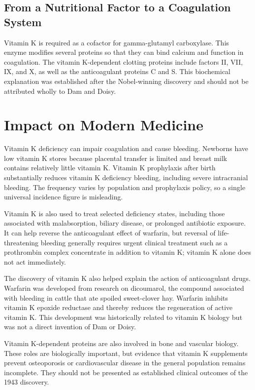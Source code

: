 \subsection{From a Nutritional Factor to a Coagulation System}

Vitamin K is required as a cofactor for gamma-glutamyl carboxylase. This enzyme modifies several proteins so that they can bind calcium and function in coagulation. The vitamin K-dependent clotting proteins include factors II, VII, IX, and X, as well as the anticoagulant proteins C and S. This biochemical explanation was established after the Nobel-winning discovery and should not be attributed wholly to Dam and Doisy.

\section{Impact on Modern Medicine}

Vitamin K deficiency can impair coagulation and cause bleeding. Newborns have low vitamin K stores because placental transfer is limited and breast milk contains relatively little vitamin K. Vitamin K prophylaxis after birth substantially reduces vitamin K deficiency bleeding, including severe intracranial bleeding. The frequency varies by population and prophylaxis policy, so a single universal incidence figure is misleading.\cite{nih-vitamin-k}

Vitamin K is also used to treat selected deficiency states, including those associated with malabsorption, biliary disease, or prolonged antibiotic exposure. It can help reverse the anticoagulant effect of warfarin, but reversal of life-threatening bleeding generally requires urgent clinical treatment such as a prothrombin complex concentrate in addition to vitamin K; vitamin K alone does not act immediately.

The discovery of vitamin K also helped explain the action of anticoagulant drugs. Warfarin was developed from research on dicoumarol, the compound associated with bleeding in cattle that ate spoiled sweet-clover hay. Warfarin inhibits vitamin K epoxide reductase and thereby reduces the regeneration of active vitamin K. This development was historically related to vitamin K biology but was not a direct invention of Dam or Doisy.

Vitamin K-dependent proteins are also involved in bone and vascular biology. These roles are biologically important, but evidence that vitamin K supplements prevent osteoporosis or cardiovascular disease in the general population remains incomplete. They should not be presented as established clinical outcomes of the 1943 discovery.

